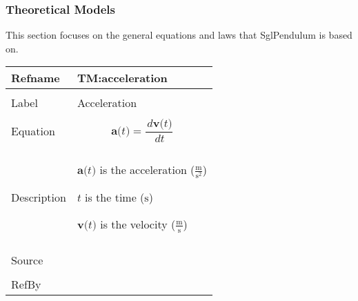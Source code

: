 \documentclass[12pt]{article}
\begin{document}
\subsubsection{Theoretical Models}
\label{Sec:TMs}
This section focuses on the general equations and laws that SglPendulum is based on.

\vspace{\baselineskip}
\noindent
\begin{minipage}{\textwidth}
\begin{tabular}{>{\raggedright}p{}>{\raggedright\arraybackslash}p{}}
\toprule \textbf{Refname} & \textbf{TM:acceleration}
\label{TM:acceleration}
\\ \midrule \\
Label & Acceleration
        
\\ \midrule \\
Equation & \begin{displaymath}
           \symbf{a}\text{(}t\text{)}=\frac{\,d\symbf{v}\text{(}t\text{)}}{\,dt}
           \end{displaymath}
\\ \midrule \\
Description & \begin{symbDescription}
              \item{$\symbf{a}\text{(}t\text{)}$ is the acceleration ($\frac{\text{m}}{\text{s}^{2}}$)}
              \item{$t$ is the time (${\text{s}}$)}
              \item{$\symbf{v}\text{(}t\text{)}$ is the velocity ($\frac{\text{m}}{\text{s}}$)}
              \end{symbDescription}
\\ \midrule \\
Source & \cite{accelerationWiki}
         
\\ \midrule \\
RefBy & 
\\ \bottomrule
\end{tabular}
\end{minipage}
\vspace{\baselineskip}
\noindent
\end{document}
